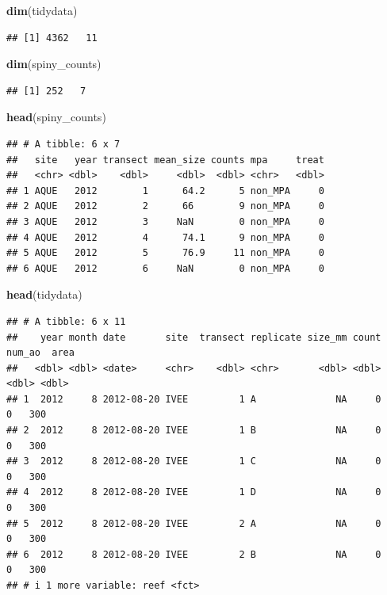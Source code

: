 \documentclass[
]{article}
\newenvironment{Shaded}{\begin{snugshade}}{\end{snugshade}}
\newcommand{\FunctionTok}[1]{\textcolor[rgb]{0.13,0.29,0.53}{\textbf{#1}}}
\newcommand{\NormalTok}[1]{#1}
\begin{document}
\begin{Shaded}
\begin{Highlighting}[]
\FunctionTok{dim}\NormalTok{(tidydata)}
\end{Highlighting}
\end{Shaded}

\begin{verbatim}
## [1] 4362   11
\end{verbatim}

\begin{Shaded}
\begin{Highlighting}[]
\FunctionTok{dim}\NormalTok{(spiny\_counts)}
\end{Highlighting}
\end{Shaded}

\begin{verbatim}
## [1] 252   7
\end{verbatim}

\begin{Shaded}
\begin{Highlighting}[]
\FunctionTok{head}\NormalTok{(spiny\_counts)}
\end{Highlighting}
\end{Shaded}

\begin{verbatim}
## # A tibble: 6 x 7
##   site   year transect mean_size counts mpa     treat
##   <chr> <dbl>    <dbl>     <dbl>  <dbl> <chr>   <dbl>
## 1 AQUE   2012        1      64.2      5 non_MPA     0
## 2 AQUE   2012        2      66        9 non_MPA     0
## 3 AQUE   2012        3     NaN        0 non_MPA     0
## 4 AQUE   2012        4      74.1      9 non_MPA     0
## 5 AQUE   2012        5      76.9     11 non_MPA     0
## 6 AQUE   2012        6     NaN        0 non_MPA     0
\end{verbatim}

\begin{Shaded}
\begin{Highlighting}[]
\FunctionTok{head}\NormalTok{(tidydata)}
\end{Highlighting}
\end{Shaded}

\begin{verbatim}
## # A tibble: 6 x 11
##    year month date       site  transect replicate size_mm count num_ao  area
##   <dbl> <dbl> <date>     <chr>    <dbl> <chr>       <dbl> <dbl>  <dbl> <dbl>
## 1  2012     8 2012-08-20 IVEE         1 A              NA     0      0   300
## 2  2012     8 2012-08-20 IVEE         1 B              NA     0      0   300
## 3  2012     8 2012-08-20 IVEE         1 C              NA     0      0   300
## 4  2012     8 2012-08-20 IVEE         1 D              NA     0      0   300
## 5  2012     8 2012-08-20 IVEE         2 A              NA     0      0   300
## 6  2012     8 2012-08-20 IVEE         2 B              NA     0      0   300
## # i 1 more variable: reef <fct>
\end{verbatim}
\end{document}
